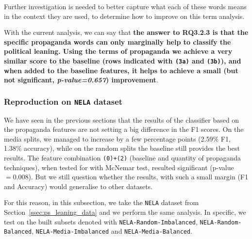 Further investigation is needed to better capture what each of these words means in the context they are used, to determine how to improve on this term analysis.%

With the current analysis, we can say that \textbf{the answer to RQ3.2.3 is that the specific propaganda words can only marginally help to classify the political leaning. Using the terms of propaganda we achieve a very similar score to the baseline (rows indicated with \texttt{(3a)} and \texttt{(3b)}), and when added to the baseline features, it helps to achieve a small (but not significant, \textit{p-value=0.657}) improvement}. %


\subsubsection{\statusgreen Reproduction on \texttt{NELA} dataset}




We have seen in the previous sections that the results of the classifier based on the propaganda features are not setting a big difference in the F1 scores. On the media splits, we managed to increase by a few percentage points (2.59\% F1, 1.38\% accuracy), while on the random splits the baseline still provides the best results.
The feature combination \texttt{(0)+(2)} (baseline and quantity of propaganda techniques), when tested for with McNemar test, resulted significant (p-value $=0.008$).
But we still question whether the results, with such a small margin (F1 and Accuracy) would generalise to other datasets.

For this reason, in this subsection, we take the \texttt{NELA} dataset from Section~\ref{ssec:ps_leaning_data} and we perform the same analysis. In specific, we test on the built subsets denoted with \texttt{NELA-Random-Imbalanced}, \texttt{NELA-Random-Balanced}, \texttt{NELA-Media-Imbalanced} and \texttt{NELA-Media-Balanced}.


